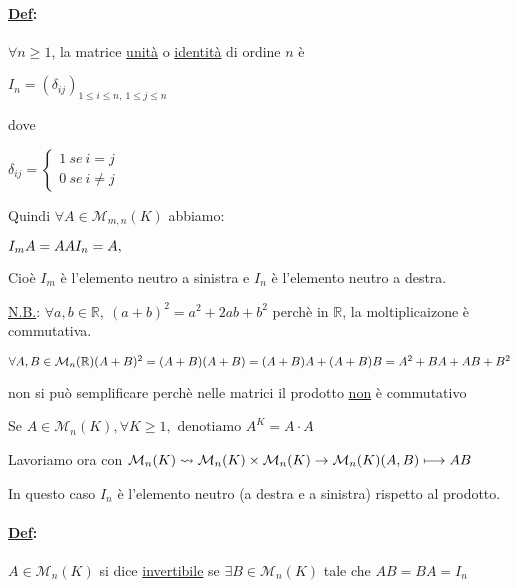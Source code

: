 \documentclass{article}
\newcommand{\ul}[1]{\underline{#1}}
\newcommand{\R}{\mathbb{R}}
\newcommand{\M}{\mathcal{M}}
\newcommand{\Def}[2]{\paragraph{\ul{Def}:}#1\\\hspace*{3em}\begin{minipage}{.8\textwidth}#2\end{minipage}}
\begin{document}
\Def{$\forall n\ge1$, la matrice \ul{unità} o \ul{identità} di ordine $n$ è}{
	$I_n=(\delta_{ij})_{1\le i\le n,\ 1\le j\le n}$

	dove

	$\delta_{ij}=\begin{cases}1\ se\ i=j\\0\ se\ i\not=j\end{cases}$

	Quindi $\forall A\in\M_{m,n}(K)$ abbiamo:

	$I_mA=A\\AI_n=A,$

	Cioè $I_m$ è l'elemento neutro a sinistra e $I_n$ è l'elemento neutro a destra.

	\ul{N.B.}: $\forall a,b\in\R,\ (a+b)^2=a^2+2ab+b^2$ perchè in $\R$, la moltiplicaizone è commutativa.

	$\forall A,B\in\M_n(\R)\\(A+B)^2=\\(A+B)(A+B)=\\(A+B)A+(A+B)B=\\A^2+BA+AB+B^2$

	non si può semplificare perchè nelle matrici il prodotto \ul{non} è commutativo

	Se $A\in\M_n(K),\forall K\ge1,\text{ denotiamo }A^K=A\cdot A$
}

Lavoriamo ora con $\M_n(K)\rightsquigarrow\M_n(K)\times\M_n(K)\rightarrow\M_n(K)\\(A,B)\longmapsto AB$

In questo caso $I_n$ è l'elemento neutro (a destra e a sinistra) rispetto al prodotto.

\Def{$A\in \M_n(K)$ si dice \ul{invertibile} se $\exists B\in \M_n(K)$ tale che $AB=BA=I_n$}{}
\end{document}
